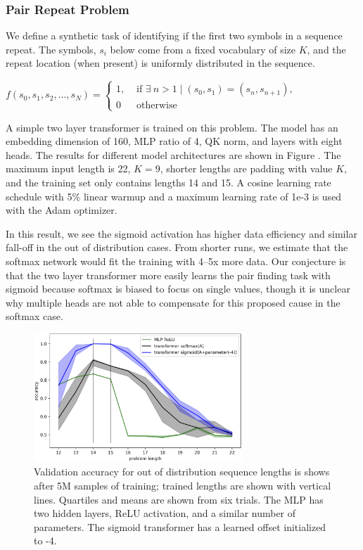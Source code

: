 \subsubsection{Pair Repeat Problem}
\label{sec:a_se_pair_repeat_prob}

We define a synthetic task of identifying if the first two symbols in a sequence repeat.  The symbols, $s_i$ below come from a fixed vocabulary of size $K$, and the repeat location (when present) is uniformly distributed in the sequence.

\begin{center}
\begin{math}
f(s_0, s_1, s_2, ..., s_N) = \begin{cases}
1, & \text{ if } \exists \ n>1 \mid (s_0, s_1) = (s_n, s_{n+1}), \\
0 & \text{ otherwise}
\end{cases}
\end{math}
\end{center}

A simple two layer transformer is trained on this problem.  The model has an embedding dimension of 160, MLP ratio of 4, QK norm, and layers with eight heads.  The results for different model architectures are shown in Figure .  The maximum input length is 22, $K=9$, shorter lengths are padding with value $K$, and the training set only contains lengths 14 and 15.  A cosine learning rate schedule with 5\% linear warmup and a maximum learning rate of 1e-3 is used with the Adam optimizer.  

In this result, we see the sigmoid activation has higher data efficiency and similar fall-off in the out of distribution cases.  From shorter runs, we estimate that the softmax network would fit the training with 4--5x more data.  Our conjecture is that the two layer transformer more easily learns the pair finding task with sigmoid because softmax is biased to focus on single values, though it is unclear why multiple heads are not able to compensate for this proposed cause in the softmax case.

\begin{figure}[h]
    \centering
    \includegraphics[width=0.7\textwidth]{figures/seq_length_results.png}
    \caption{Validation accuracy for out of distribution sequence lengths is shows after 5M samples of training; trained lengths are shown with vertical lines.  Quartiles and means are shown from six trials.  The MLP has two hidden layers, ReLU activation, and a similar number of parameters.  The sigmoid transformer has a learned offset initialized to -4.}
    \label{fig:repeat_seq_results}
\end{figure}
